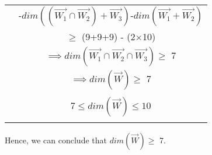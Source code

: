 \documentclass[journal,12pt,twocolumn]{IEEEtran}
\renewcommand\thesection{\arabic{section}}
\begin{document}
\begin{table}[h!]
\begin{center}
\begin{tabular}{|c|c|}
& -$dim((\vec{W_1} \cap \vec{W_2})+\vec{W_3})$-$dim(\vec{W_1}+\vec{W_2})$\\
& $\geq$ (9+9+9) - (2$\times$10)\\
& $\implies dim(\vec{W_1} \cap \vec{W_2} \cap \vec{W_3}) \geq $ 7\\
& $\implies dim(\vec{W}) \geq $ 7\\
& \\
& $7 \leq dim(\vec{W}) \leq 10$\\
& \\
\hline
\end{tabular}
\end{center}
\end{table}

Hence, we can conclude that $dim(\vec{W}) \geq$ 7.
\end{document}
